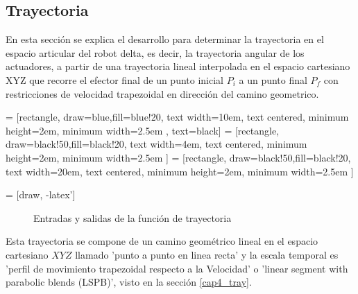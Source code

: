     \newpage

    \subsection{Trayectoria}
    
    En esta sección se explica el desarrollo para determinar la trayectoria en el espacio articular del robot delta, es decir, la trayectoria angular de los actuadores, a partir de una trayectoria lineal interpolada en el espacio cartesiano XYZ que recorre el efector final de un punto inicial $P_i$ a un punto final $P_f$ con restricciones de velocidad trapezoidal en dirección del camino geometrico.

         = [rectangle, draw=blue,fill=blue!20, text width=10em, text centered, minimum height=2em, minimum width=2.5em , text=black]
         = [rectangle, draw=black!50,fill=black!20, text width=4em, text centered, minimum height=2em, minimum width=2.5em ]
         = [rectangle, draw=black!50,fill=black!20, text width=20em, text centered, minimum height=2em, minimum width=2.5em ]

         = [draw, -latex']
         \begin{center}
         \begin{figure}[htb]
                \caption{Entradas y salidas de la función de trayectoria}
                \label{f:cap6_trayectory_1}
         \end{figure}
         \end{center}
         
        \vspace{-1cm}   

        
    Esta trayectoria se compone de un camino geométrico lineal en el espacio cartesiano $XYZ$ llamado 'punto a punto en linea recta' y la escala temporal es 'perfil de movimiento trapezoidal respecto a la Velocidad' o 'linear segment with parabolic blends (LSPB)', visto en la sección \ref{cap4_tray}. 
    
